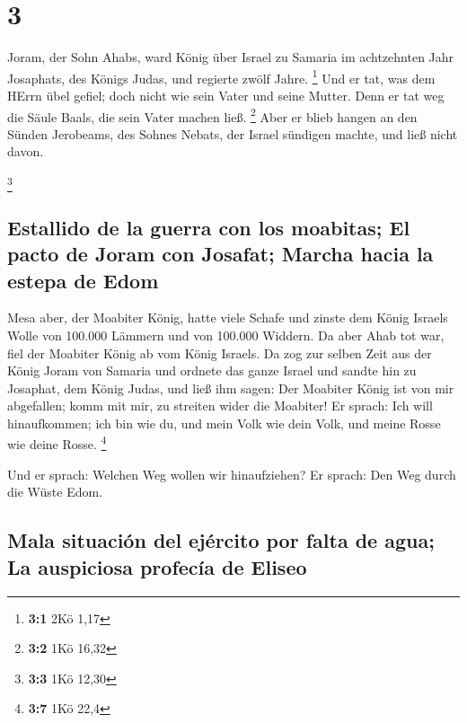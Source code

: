 \hypertarget{section-2}{%
\section{3}\label{section-2}}

 Joram, der Sohn Ahabs, ward König über Israel zu Samaria
im achtzehnten Jahr Josaphats, des Königs Judas, und regierte zwölf
Jahre. \footnote{\textbf{3:1} 2Kö 1,17}  Und er tat, was
dem HErrn übel gefiel; doch nicht wie sein Vater und seine Mutter. Denn
er tat weg die Säule Baals, die sein Vater machen ließ. \footnote{\textbf{3:2}
  1Kö 16,32}  Aber er blieb hangen an den Sünden
Jerobeams, des Sohnes Nebats, der Israel sündigen machte, und ließ nicht
davon.

\footnote{\textbf{3:3} 1Kö 12,30}

\hypertarget{estallido-de-la-guerra-con-los-moabitas-el-pacto-de-joram-con-josafat-marcha-hacia-la-estepa-de-edom}{%
\subsection{Estallido de la guerra con los moabitas; El pacto de Joram
con Josafat; Marcha hacia la estepa de
Edom}\label{estallido-de-la-guerra-con-los-moabitas-el-pacto-de-joram-con-josafat-marcha-hacia-la-estepa-de-edom}}

 Mesa aber, der Moabiter König, hatte viele Schafe und
zinste dem König Israels Wolle von 100.000 Lämmern und von 100.000
Widdern.  Da aber Ahab tot war, fiel der Moabiter König ab
vom König Israels.  Da zog zur selben Zeit aus der König
Joram von Samaria und ordnete das ganze Israel  und sandte
hin zu Josaphat, dem König Judas, und ließ ihm sagen: Der Moabiter König
ist von mir abgefallen; komm mit mir, zu streiten wider die Moabiter! Er
sprach: Ich will hinaufkommen; ich bin wie du, und mein Volk wie dein
Volk, und meine Rosse wie deine Rosse. \footnote{\textbf{3:7} 1Kö 22,4}

 Und er sprach: Welchen Weg wollen wir hinaufziehen? Er
sprach: Den Weg durch die Wüste Edom.

\hypertarget{mala-situaciuxf3n-del-ejuxe9rcito-por-falta-de-agua-la-auspiciosa-profecuxeda-de-eliseo}{%
\subsection{Mala situación del ejército por falta de agua; La auspiciosa
profecía de
Eliseo}\label{mala-situaciuxf3n-del-ejuxe9rcito-por-falta-de-agua-la-auspiciosa-profecuxeda-de-eliseo}}

